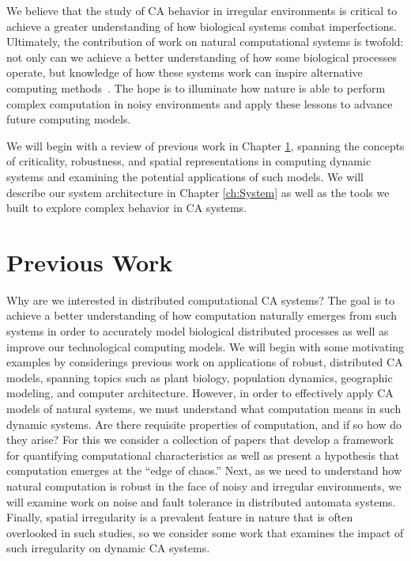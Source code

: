 \documentclass[a4paper,11pt]{report}
\begin{document}
We believe that the study of CA behavior in irregular environments is critical to achieve a greater understanding of how biological systems combat imperfections. Ultimately, the contribution of work on natural computational systems is twofold: not only can we achieve a better understanding of how some biological processes operate, but knowledge of how these systems work can inspire alternative computing methods~\cite{ma96, si04}. The hope is to illuminate how nature is able to perform complex computation in noisy environments and apply these lessons to advance future computing models.

We will begin with a review of previous work in Chapter \ref{ch:Prev}, spanning the concepts of criticality, robustness, and spatial representations in computing dynamic systems and examining the potential applications of such models. We will describe our system architecture in Chapter \ref{ch:System} as well as the tools we built to explore complex behavior in CA systems.

\chapter{Previous Work}
\label{ch:Prev}

Why are we interested in distributed computational CA systems? The goal is to achieve a better understanding of how computation naturally emerges from such systems in order to accurately model biological distributed processes as well as improve our technological computing models. We will begin with some motivating examples by considerings previous work on applications of robust, distributed CA models, spanning topics such as plant biology, population dynamics, geographic modeling, and computer architecture. However, in order to effectively apply CA models of natural systems, we must understand what computation means in such dynamic systems. Are there requisite properties of computation, and if so how do they arise? For this we consider a collection of papers that develop a framework for quantifying computational characteristics as well as present a hypothesis that computation emerges at the ``edge of chaos.'' Next, as we need to understand how natural computation is robust in the face of noisy and irregular environments, we will examine work on noise and fault tolerance in distributed automata systems. Finally, spatial irregularity is a prevalent feature in nature that is often overlooked in such studies, so we consider some work that examines the impact of such irregularity on dynamic CA systems.
\end{document}
